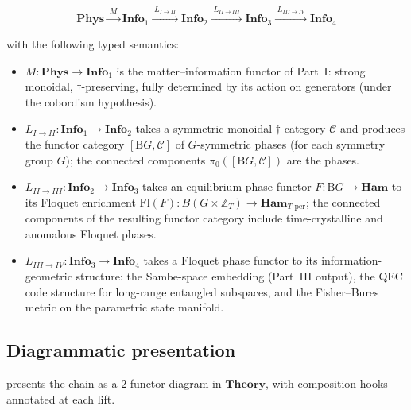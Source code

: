 \documentclass[12pt]{article}
\theoremstyle{definition}
\theoremstyle{remark}
\newcommand{\C}{\mathcal{C}}
\newcommand{\Phys}{\mathbf{Phys}}
\newcommand{\Info}{\mathbf{Info}}
\newcommand{\Ham}{\mathbf{Ham}}
\newcommand{\Theory}{\mathbf{Theory}}
\newcommand{\BG}{\mathrm{B}G}
\newcommand{\Z}{\mathbb{Z}}
\begin{document}
\begin{equation}
\label{eq:main-chain}
\Phys \xrightarrow{\;M\;} \Info_1 \xrightarrow{\;L_{I \to II}\;} \Info_2
\xrightarrow{\;L_{II \to III}\;} \Info_3 \xrightarrow{\;L_{III \to IV}\;}
\Info_4
\end{equation}

with the following typed semantics:

\begin{itemize}[leftmargin=2em]
\item $M : \Phys \to \Info_1$ is the matter--information functor of Part~I:
  strong monoidal, $\dagger$-preserving, fully determined by its action on
  generators (under the cobordism hypothesis).
\item $L_{I \to II} : \Info_1 \to \Info_2$ takes a symmetric monoidal
  $\dagger$-category $\C$ and produces the functor category $[\BG, \C]$ of
  $G$-symmetric phases (for each symmetry group $G$); the connected
  components $\pi_0([\BG, \C])$ are the phases.
\item $L_{II \to III} : \Info_2 \to \Info_3$ takes an equilibrium phase
  functor $F : \BG \to \Ham$ to its Floquet enrichment $\mathrm{Fl}(F) :
  B(G \times \Z_T) \to \Ham_{T\text{-per}}$; the connected components of the
  resulting functor category include time-crystalline and anomalous Floquet
  phases.
\item $L_{III \to IV} : \Info_3 \to \Info_4$ takes a Floquet phase functor
  to its information-geometric structure: the Sambe-space embedding (Part~III
  output), the QEC code structure for long-range entangled subspaces, and
  the Fisher--Bures metric on the parametric state manifold.
\end{itemize}

\subsection{Diagrammatic presentation}

 presents the chain as a $2$-functor diagram in
$\Theory$, with composition hooks annotated at each lift.
\end{document}
